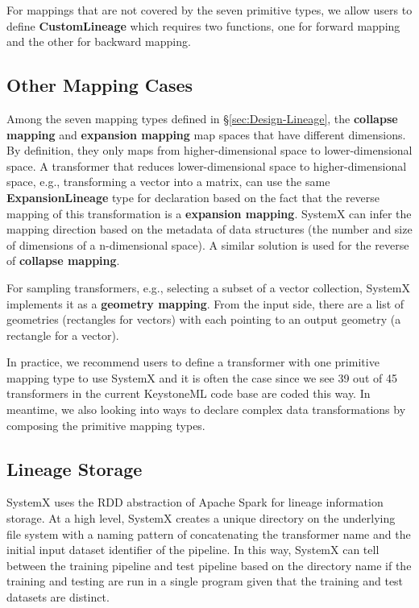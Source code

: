 \documentclass{sig-alternate}
\begin{document}
For mappings that are not covered by the seven primitive types, we allow users to define {\bf CustomLineage}
which requires two functions, one for forward mapping and the other for backward mapping.

\subsection{Other Mapping Cases}
Among the seven mapping types defined in \S\ref{sec:Design-Lineage}, the {\bf collapse mapping} and {\bf expansion mapping}
map spaces that have different dimensions. By definition, they only maps from higher-dimensional space to lower-dimensional space.
A transformer that reduces lower-dimensional space to higher-dimensional space, e.g., transforming a vector into a matrix, can use
the same {\bf ExpansionLineage} type for declaration based on the fact that the reverse mapping of this transformation is a
{\bf expansion mapping}. SystemX can infer the mapping direction based on the metadata of data structures 
(the number and size of dimensions of a n-dimensional space). 
A similar solution is used for the reverse of {\bf collapse mapping}.

For sampling transformers, e.g., selecting a subset of a vector collection, SystemX implements it as a {\bf geometry mapping}.
From the input side, there are a list of geometries (rectangles for vectors) with each pointing to an output geometry (a rectangle for a vector).

In practice, we recommend users to define a transformer with one primitive mapping type to use SystemX and it is often the case since
we see 39 out of 45 transformers in the current KeystoneML code base are coded this way. 
In meantime, we also looking into ways to declare complex data transformations by composing the primitive mapping types.


\subsection{Lineage Storage}
SystemX uses the RDD abstraction of Apache Spark for lineage information storage. 
At a high level, SystemX creates a unique directory on the underlying file system with a naming pattern of 
concatenating the transformer name and the initial input dataset identifier of the pipeline.
In this way, SystemX can tell between the training pipeline and test pipeline based on the directory name
if the training and testing are run in a single program given that the training and test datasets are distinct.
\end{document}
